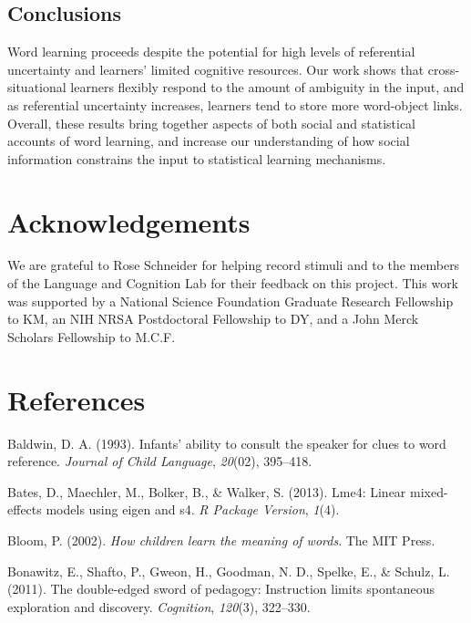 \documentclass[authoryear, review]{elsarticle}
\begin{document}
\subsection{Conclusions}\label{conclusions}

Word learning proceeds despite the potential for high levels of
referential uncertainty and learners' limited cognitive resources. Our
work shows that cross-situational learners flexibly respond to the
amount of ambiguity in the input, and as referential uncertainty
increases, learners tend to store more word-object links. Overall, these
results bring together aspects of both social and statistical accounts
of word learning, and increase our understanding of how social
information constrains the input to statistical learning mechanisms.

\newpage

\section{Acknowledgements}\label{acknowledgements}

We are grateful to Rose Schneider for helping record stimuli and to the
members of the Language and Cognition Lab for their feedback on this
project. This work was supported by a National Science Foundation
Graduate Research Fellowship to KM, an NIH NRSA Postdoctoral Fellowship
to DY, and a John Merck Scholars Fellowship to M.C.F.

\newpage

\section{References}\label{references}

\setlength{\parindent}{-0.1in} \setlength{\leftskip}{0.125in} \noindent

\hypertarget{refs}{}
\hypertarget{ref-baldwin1993infants}{}
Baldwin, D. A. (1993). Infants' ability to consult the speaker for clues
to word reference. \emph{Journal of Child Language}, \emph{20}(02),
395--418.

\hypertarget{ref-bates2013lme4}{}
Bates, D., Maechler, M., Bolker, B., \& Walker, S. (2013). Lme4: Linear
mixed-effects models using eigen and s4. \emph{R Package Version},
\emph{1}(4).

\hypertarget{ref-bloom2002children}{}
Bloom, P. (2002). \emph{How children learn the meaning of words}. The
MIT Press.

\hypertarget{ref-bonawitz2011double}{}
Bonawitz, E., Shafto, P., Gweon, H., Goodman, N. D., Spelke, E., \&
Schulz, L. (2011). The double-edged sword of pedagogy: Instruction
limits spontaneous exploration and discovery. \emph{Cognition},
\emph{120}(3), 322--330.
\end{document}
